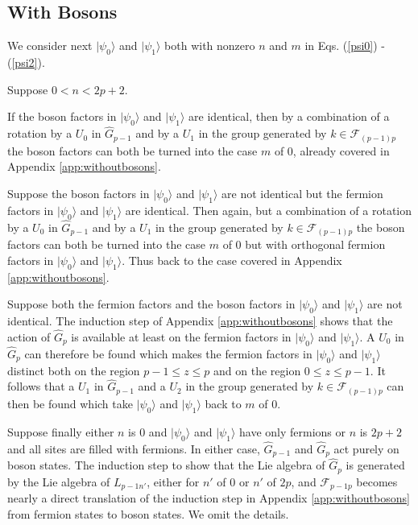 \documentclass[twocolumn,amsmath,amssymb]{revtex4-1}
\begin{document}
\subsection{\label{app:withbosons} With Bosons}

We consider next $|\psi_0 \rangle $ and $|\psi_1 \rangle $ both with nonzero $n$ and $m$ in Eqs. (\ref{psi0}) - (\ref{psi2}).

Suppose $0 < n < 2 p + 2$.

If the boson factors in $|\psi_0 \rangle $ and $|\psi_1 \rangle $ are identical, then by a combination of
a rotation by a $U_0$ in $\hat{G}_{p-1}$ and by a $U_1$ in the group generated by $k \in \mathcal{F}_{(p-1) p}$
the boson factors can both be turned into the case $m$ of 0, already covered in Appendix \ref{app:withoutbosons}.

Suppose the boson factors in $|\psi_0 \rangle $ and $|\psi_1 \rangle $ are not identical but the fermion factors
in $|\psi_0 \rangle $ and $|\psi_1 \rangle $ are identical.  Then again, but a combination of
a rotation by a $U_0$ in $\hat{G}_{p-1}$ and by a $U_1$ in the group generated by $k \in \mathcal{F}_{(p-1) p}$
the boson factors can both be turned into the case $m$ of 0 but
with orthogonal fermion factors in $|\psi_0 \rangle $ and $|\psi_1 \rangle $. Thus back to
the case covered in Appendix \ref{app:withoutbosons}.

Suppose both the fermion factors and the boson factors
in $|\psi_0 \rangle $ and $|\psi_1 \rangle $ are not identical. The induction step of
Appendix \ref{app:withoutbosons} shows that the action of $\hat{G}_p$ is
available at least on the fermion factors in $|\psi_0 \rangle $ and $|\psi_1 \rangle $.
A $U_0$ in $\hat{G}_p$ can therefore be found which makes the fermion factors in
$|\psi_0 \rangle $ and $|\psi_1 \rangle $ distinct both on the region $p-1 \le z \le p$
and on the region $0 \le z \le p - 1$. It follows that a $U_1$ in $\hat{G}_{p-1}$
and a $U_2$ in the group generated by $k \in \mathcal{F}_{(p-1) p}$ can then be found
which take $|\psi_0 \rangle $ and $|\psi_1 \rangle $ back to $m$ of 0.

Suppose finally either $n$ is 0 and $|\psi_0 \rangle $ and $|\psi_1 \rangle $ have only fermions
or $n$ is $2 p + 2$ and all sites are filled with fermions. In either case,
$\hat{G}_{p-1}$ and $\hat{G}_p$ act purely on boson states. The induction
step to show that the Lie algebra of $\hat{G}_p$ is generated by 
the Lie algebra of 
$L_{p-1 n'}$, either for $n'$ of 0 or $n'$ of $2 p$, and $\mathcal{F}_{p-1 p}$
becomes nearly a direct translation of the induction step in Appendix \ref{app:withoutbosons}
from fermion states to boson states. We omit the details.
\end{document}
